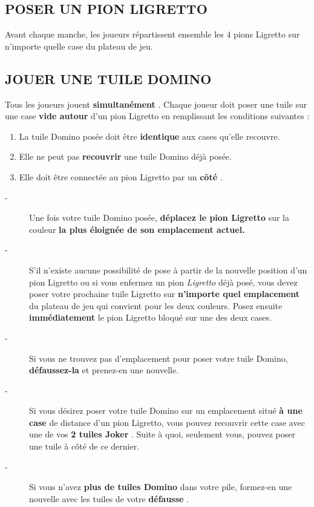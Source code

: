 \documentclass{article}%
\begin{document}
%
\subsection{ POSER UN PION LIGRETTO
}%
\label{subsec:POSERUNPIONLIGRETTO}%
Avant chaque manche, les joueurs répartissent ensemble les 4 pions Ligretto sur n’importe quelle case du plateau de jeu.


%
\subsection{ JOUER UNE TUILE DOMINO
}%
\label{subsec:JOUERUNETUILEDOMINO}%
Tous les joueurs jouent %
\textbf{simultanément}%
.
%
Chaque joueur doit poser une tuile sur une case %
\textbf{vide autour}%
\textit{ }%
 d'un pion Ligretto en remplissant les conditions suivantes :
%
\begin{enumerate}%
\item%
%
 La tuile Domino posée doit être %
\textbf{identique}%
\textit{ }%
 aux cases qu'elle recouvre.
%
\item%
%
 Elle ne peut pas %
\textbf{recouvrir}%
\textit{ }%
 une tuile Domino déjà posée.
%
\item%
%
 Elle doit être connectée au pion Ligretto par un %
\textbf{côté}%
.
%
\end{enumerate}%
\begin{description}%
\item[{-} ]%
%
 Une fois votre tuile Domino posée, %
\textbf{déplacez le pion Ligretto}%
\textit{ }%
 sur la couleur %
\textbf{la plus éloignée de son emplacement actuel.
}%
\item[{-} ]%
%
 S'il n'existe aucune possibilité de pose à partir de la nouvelle position d'un pion Ligretto ou si vous enfermez un pion %
\textit{Ligretto}%
\textit{ }%
 déjà posé, vous devez poser votre prochaine tuile Ligretto sur %
\textbf{n’importe quel emplacement}%
\textit{ }%
 du plateau de jeu qui convient pour les deux couleurs. Posez ensuite %
\textbf{immédiatement}%
\textit{ }%
 le pion Ligretto bloqué sur une des deux cases.
%
\item[{-} ]%
%
 Si vous ne trouvez pas d'emplacement pour poser votre tuile Domino, %
\textbf{défaussez{-}la}%
\textit{ }%
 et prenez{-}en une nouvelle.
%
\item[{-} ]%
%
 Si vous désirez poser votre tuile Domino sur un emplacement situé %
\textbf{à une case}%
\textit{ }%
 de distance d'un pion Ligretto, vous pouvez recouvrir cette case avec une de vos %
\textbf{2 tuiles Joker}%
. Suite à quoi, seulement vous, pouvez poser une tuile à côté de ce dernier.
%
\item[{-} ]%
%
 Si vous n'avez %
\textbf{plus de tuiles Domino}%
\textit{ }%
 dans votre pile, formez{-}en une nouvelle avec les tuiles de votre %
\textbf{défausse}%
.
%
\end{description}
\end{document}
